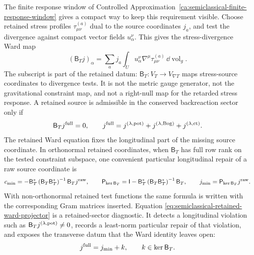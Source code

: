 The finite response window of
Controlled Approximation~\ref{ca:semiclassical-finite-response-window} gives a
compact way to keep this requirement visible.  Choose retained stress profiles
\(\tau_{\mu\nu}^{(a)}\) dual to the source coordinates \(j_a\), and test the
divergence against compact vector fields \(u_\alpha^\nu\).  This gives the
stress-divergence Ward map
\begin{equation}
  (\mathsf B_T j)_\alpha
  =
  \sum_a j_a
  \int_U
  u_\alpha^\nu\nabla^\mu\tau_{\mu\nu}^{(a)}
  \,\dd\operatorname{vol}_g .
  \label{eq:semiclassical-retained-ward-map}
\end{equation}
The subscript is part of the retained datum:
\(\mathsf B_T:V_T\to V_{\nabla T}\) maps stress-source coordinates to
divergence tests.  It is not the metric gauge generator, not the gravitational
constraint map, and not a right-null map for the retarded stress response.
A retained source is admissible in the conserved backreaction sector only if
\begin{equation}
  \mathsf B_T j^{\rm full}=0,
  \qquad
  j^{\rm full}
  =
  j^{(\lambda,{\rm pot})}
  +
  j^{(\lambda,{\rm Bog})}
  +
  j^{(\lambda,{\rm ct})}.
  \label{eq:semiclassical-retained-source-ward-condition}
\end{equation}
The retained Ward equation fixes the longitudinal part of the missing source
coordinate.  In orthonormal retained coordinates, when \(\mathsf B_T\) has full
row rank on the tested constraint subspace, one convenient particular
longitudinal repair of a raw source coordinate is
\begin{equation}
  c_{\rm min}
  =
  -
  \mathsf B_T^*
  \left(\mathsf B_T\mathsf B_T^*\right)^{-1}
  \mathsf B_T j^{\rm raw},
  \qquad
  \mathsf P_{\ker \mathsf B_T}
  =
  \mathsf I-\mathsf B_T^*
  \left(\mathsf B_T\mathsf B_T^*\right)^{-1}
  \mathsf B_T,
  \qquad
  j_{\rm min}
  =
  \mathsf P_{\ker \mathsf B_T}j^{\rm raw}.
  \label{eq:semiclassical-retained-ward-projector}
\end{equation}
With non-orthonormal retained test functions the same formula is written with
the corresponding Gram matrices inserted.  Equation
\eqref{eq:semiclassical-retained-ward-projector} is a retained-sector
diagnostic.  It detects a longitudinal violation such as
\(\mathsf B_T j^{(\lambda,{\rm pot})}\ne0\), records a least-norm particular
repair of that violation, and exposes the transverse datum that the Ward
identity leaves open:
\begin{equation}
  j^{\rm full}
  =
  j_{\rm min}+k,
  \qquad
  k\in\ker\mathsf B_T .
  \label{eq:semiclassical-retained-ward-transverse-freedom}
\end{equation}
